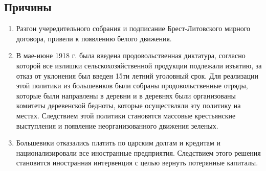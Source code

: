 \documentclass[a4paper]{article}
\begin{document}
\subsection{Причины}
\begin{enumerate}
    \item Разгон учередительного собрания и подписание Брест-Литовского мирного договора, привели к появлению белого движения.
    \item В мае-июне 1918 г. была введена продовольственная диктатура, согласно которой все излишки сельскохозяйственной продукции подлежали изъятию, за отказ от уклонения был введен 15ти летний уголовный срок. Для реализации этой политики из большевиков были собраны продовольственные отряды, которые были направлены в деревни и в деревнях были организованы комитеты деревенской бедноты, которые осуществляли эту политику на местах. Следствием этой политики становятся массовые крестьянские выступления и появление неорганизованного движения зеленых.
    \item Большевики отказались платить по царским долгам и кредитам и национализировали все иностранные предприятия. Следствием этого решения становится иностранная интервенция с целью вернуть потерянные капиталы.
\end{enumerate}
\end{document}
